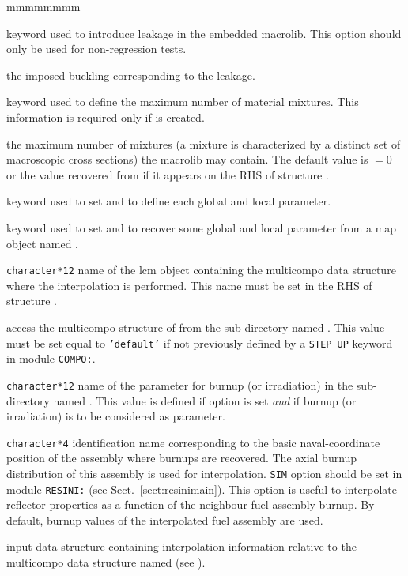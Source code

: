 \begin{ListeDeDescription}{mmmmmmmm}
\item[\moc{LEAK}] keyword used to introduce leakage in the embedded {\sc macrolib}. This option should only be used for non-regression tests.

\item[\dusa{b2}] the imposed buckling corresponding to the leakage.

\item[\moc{NMIX}] keyword used to define the maximum number of material mixtures. This information is required  only if  is created.

\item[\dusa{nmixt}] the maximum number of mixtures (a mixture is characterized by a distinct set of 
macroscopic cross sections) the {\sc macrolib} may contain. The default value is  $=0$ or the value recovered from  if it appears on
the RHS of structure .

\item[\moc{COMPO}] keyword used to set  and to define each global and local parameter.

\item[\moc{TABLE}] keyword used to set  and to recover some global and local parameter from a {\sc map} object named .

\item[\dusa{CPONAM}] {\tt character*12} name of the {\sc lcm} object containing the
{\sc multicompo} data structure where the interpolation is performed. This name must be set in the RHS of structure .

\item[\dusa{NAMDIR}] access the {\sc multicompo} structure of  from the sub-directory named .
This value must be set equal to {\tt 'default'} if not previously defined by a {\tt STEP UP} keyword in module {\tt COMPO:}.

\item[\dusa{namburn}] {\tt character*12} name of the parameter for burnup (or irradiation) in the sub-directory named .
This value is defined if option  is set {\sl and} if burnup (or irradiation) is to be considered as parameter.

\item[\dusa{naval}] {\tt character*4} identification name corresponding to the basic naval-coordinate position of the assembly where burnups are recovered. The axial burnup distribution of this assembly is
used for interpolation. {\tt SIM} option should be set in module {\tt RESINI:} (see Sect.~\ref{sect:resinimain}). This option is useful to interpolate reflector properties as a function of the
neighbour fuel assembly burnup. By default, burnup values of the interpolated fuel assembly are used.

\item[\dusa{descintf}] input data structure containing interpolation information relative to the {\sc multicompo} data structure named  (see ).

\end{ListeDeDescription}

